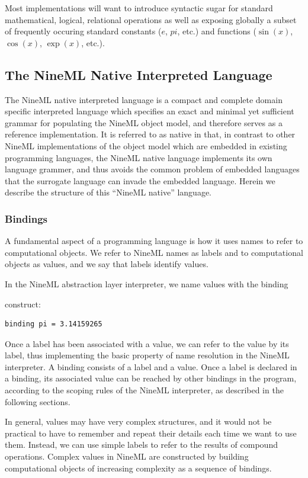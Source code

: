 \documentclass[a4paper]{article}
\begin{document}
Most implementations will want to introduce syntactic sugar for
standard mathematical, logical, relational operations as well as
exposing globally a subset of frequently occuring standard constants
($e$, $pi$, etc.) and functions ($\sin(x)$, $\cos(x)$, $\exp(x)$,
etc.).


\subsection{The NineML Native Interpreted Language}

The NineML native interpreted language is a compact and complete
domain specific interpreted language which specifies an exact and
minimal yet sufficient grammar for populating the NineML object model,
and therefore serves as a reference implementation.  It is referred to
as native in that, in contrast to other NineML implementations of
the object model which are embedded in existing programming languages,
the NineML native language implements its own language grammer, and
thus avoids the common problem of embedded languages that the
surrogate language can invade the embedded language.  Herein we
describe the structure of this ``NineML native'' language.

\subsubsection{Bindings}

A fundamental aspect of a programming language is how it uses names to
refer to computational objects.  We refer to NineML names as labels
and to computational objects as values, and we say that labels
identify values.

In the NineML abstraction layer interpreter, we name values with the binding

construct:
\begin{lstlisting}[style=display]
binding pi = 3.14159265
\end{lstlisting}

Once a label has been associated with a value, we can refer to the
value by its label, thus implementing the basic property of name
resolution in the NineML interpreter. A binding consists of a label
and a value. Once a label is declared in a binding, its associated
value can be reached by other bindings in the program, according to
the scoping rules of the NineML interpreter, as described in the
following sections.

In general, values may have very complex structures, and it would not
be practical to have to remember and repeat their details each time we
want to use them. Instead, we can use simple labels to refer to the
results of compound operations. Complex values in NineML are
constructed by building computational objects of increasing complexity
as a sequence of bindings.
\end{document}
